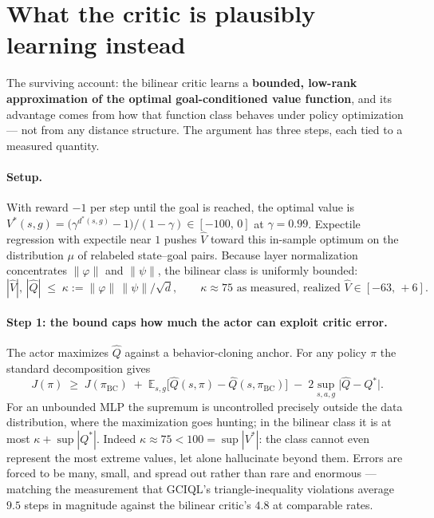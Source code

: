 \documentclass[10pt]{article}
\newcommand{\E}{\mathbb{E}}
\begin{document}
\section{What the critic is plausibly learning instead}\label{sec:instead}

The surviving account: the bilinear critic learns a \textbf{bounded, low-rank
approximation of the optimal goal-conditioned value function}, and its advantage comes
from how that function class behaves under policy optimization --- not from any distance
structure. The argument has three steps, each tied to a measured quantity.

\paragraph{Setup.} With reward $-1$ per step until the goal is reached, the optimal value
is $V^*(s,g)=\big(\gamma^{d^*(s,g)}-1\big)/(1-\gamma)\in[-100,\,0]$ at $\gamma=0.99$.
Expectile regression with expectile near $1$ pushes $\hat V$ toward this in-sample optimum
on the distribution $\mu$ of relabeled state--goal pairs. Because layer normalization
concentrates $\|\varphi\|$ and $\|\psi\|$, the bilinear class is uniformly bounded:
\[
|\hat V|,\,|\hat Q| \;\le\; \kappa := \|\varphi\|\,\|\psi\|/\sqrt d,
\qquad \kappa\approx 75 \text{ as measured, realized } \hat V\in[-63,\,+6].
\]

\paragraph{Step 1: the bound caps how much the actor can exploit critic error.}
The actor maximizes $\hat Q$ against a behavior-cloning anchor. For any policy $\pi$ the
standard decomposition gives
\[
J(\pi)\;\ge\;J(\pi_{\mathrm{BC}})
\;+\;\E_{s,g}\big[\hat Q(s,\pi)-\hat Q(s,\pi_{\mathrm{BC}})\big]
\;-\;2\sup_{s,a,g}\big|\hat Q-Q^*\big| .
\]
For an unbounded MLP the supremum is uncontrolled precisely outside the data
distribution, where the maximization goes hunting; in the bilinear class it is at most
$\kappa+\sup|Q^*|$. Indeed $\kappa\approx75<100=\sup|V^*|$: the class cannot even
represent the most extreme values, let alone hallucinate beyond them. Errors are forced
to be many, small, and spread out rather than rare and enormous --- matching the
measurement that GCIQL's triangle-inequality violations average $9.5$ steps in magnitude
against the bilinear critic's $4.8$ at comparable rates.
\end{document}
